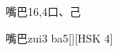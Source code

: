 \begin{entry}{嘴巴}{16,4}{⼝、⼰}
  \begin{phonetics}{嘴巴}{zui3 ba5}[][HSK 4]
  \end{phonetics}
\end{entry}
